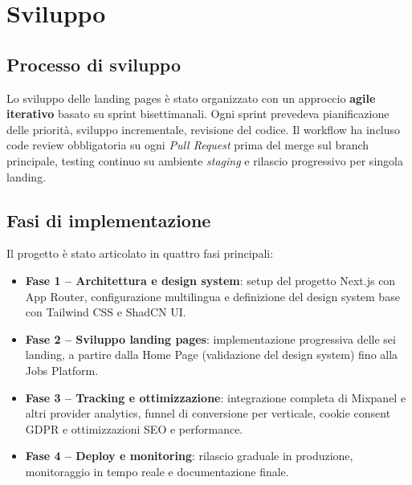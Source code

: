 \chapter{Sviluppo}

\section{Processo di sviluppo}
Lo sviluppo delle landing pages è stato organizzato con un approccio
\textbf{agile iterativo} basato su sprint bisettimanali. Ogni sprint prevedeva
pianificazione delle priorità, sviluppo incrementale, revisione del
codice.
Il workflow ha incluso code review obbligatoria su ogni \textit{Pull Request} 
prima del merge sul branch principale, testing continuo su ambiente 
\textit{staging} e rilascio progressivo per singola landing.

\section{Fasi di implementazione}
Il progetto è stato articolato in quattro fasi principali:

\begin{itemize}
  \item \textbf{Fase 1 – Architettura e design system}: setup del progetto
  Next.js con App Router, configurazione multilingua e definizione del design
  system base con Tailwind CSS e ShadCN UI.
  \item \textbf{Fase 2 – Sviluppo landing pages}: implementazione progressiva
  delle sei landing, a partire dalla Home Page (validazione del design system) 
  fino alla Jobs Platform.
  \item \textbf{Fase 3 – Tracking e ottimizzazione}: integrazione completa di
  Mixpanel e altri provider analytics, funnel di conversione per verticale, 
  cookie consent GDPR e ottimizzazioni SEO e performance.
  \item \textbf{Fase 4 – Deploy e monitoring}: rilascio graduale in produzione,
  monitoraggio in tempo reale e documentazione finale.
\end{itemize}

